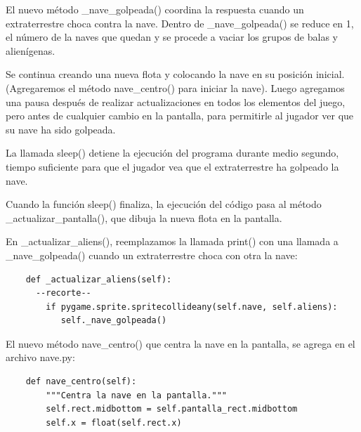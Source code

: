 El nuevo método {\ttfamily \_nave\_golpeada()} coordina la respuesta cuando un extraterrestre
choca contra la nave. Dentro de  {\ttfamily \_nave\_golpeada()}  se reduce en 1, el número de la naves que quedan
y se procede a vaciar los grupos de balas y alienígenas.

Se continua creando  una nueva flota y colocando  la nave en su posición inicial. (Agregaremos el
método {\ttfamily nave\_centro()} para iniciar la nave). Luego agregamos una pausa después de realizar actualizaciones
en todos los elementos del juego, pero antes de cualquier cambio en la pantalla, para permitirle al jugador  ver que su nave ha sido golpeada. 
 
La llamada  {\ttfamily sleep()} detiene la ejecución del programa durante medio segundo, tiempo suficiente para que el 
jugador vea que el extraterrestre ha golpeado la nave.

Cuando la función {\ttfamily sleep()} finaliza, la ejecución del código pasa al método  {\ttfamily \_actualizar\_pantalla()},
que dibuja la nueva flota en la pantalla.

En {\ttfamily\_actualizar\_aliens()}, reemplazamos la llamada {\ttfamily print()} con una llamada a {\ttfamily \_nave\_golpeada()}
cuando un extraterrestre choca con otra la nave:


\hspace{-2.4cm}{\ttfamily \scriptsize invasión}

\vspace{-0.2cm}
\hspace{-2.1cm}{\ttfamily \scriptsize \_alien.py}\vspace{-0.84cm}
\begin{lstlisting}
    def _actualizar_aliens(self):
      --recorte--
        if pygame.sprite.spritecollideany(self.nave, self.aliens):
           self._nave_golpeada()
\end{lstlisting}

El nuevo método  {\ttfamily nave\_centro()} que centra la nave en la pantalla, se agrega  en el archivo {\ttfamily nave.py}:

\hspace{-2.5cm}{\ttfamily \scriptsize nave.py}  \vspace{-0.5cm}
\begin{lstlisting}
    def nave_centro(self):
        """Centra la nave en la pantalla."""
        self.rect.midbottom = self.pantalla_rect.midbottom
        self.x = float(self.rect.x)
\end{lstlisting}


